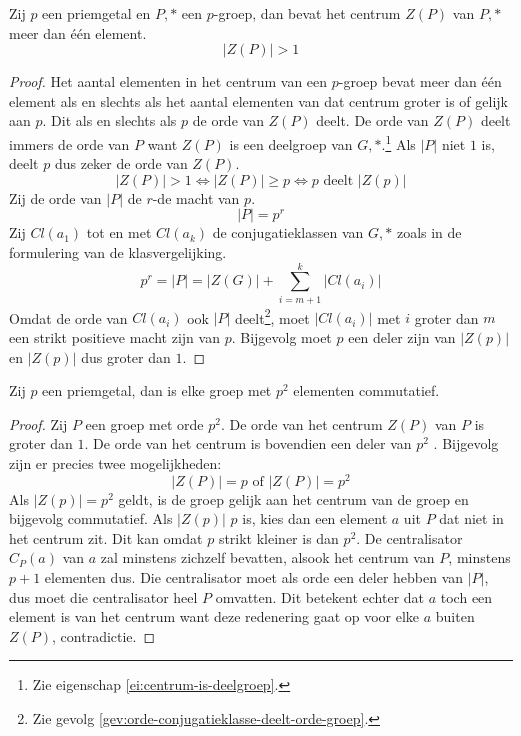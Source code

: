 \documentclass[main.tex]{subfiles}
\begin{document}
\begin{pr}
  \label{pr:orde-centrum-pgroep-groter-dan-een}
  Zij $p$ een priemgetal en $P,*$ een $p$-groep, dan bevat het centrum $Z(P)$ van $P,*$ meer dan \'e\'en element.
  \[ |Z(P)| > 1 \]
  
  \begin{proof}
    Het aantal elementen in het centrum van een $p$-groep bevat meer dan \'e\'en element als en slechts als het aantal elementen van dat centrum groter is of gelijk aan $p$.
    Dit als en slechts als $p$ de orde van $Z(P)$ deelt.
    De orde van $Z(P)$ deelt immers de orde van $P$ want $Z(P)$ is een deelgroep van $G,*$.\footnote{Zie eigenschap \ref{ei:centrum-is-deelgroep}.} 
    Als $|P|$ niet $1$ is, deelt $p$ dus zeker de orde van $Z(P)$.
    \[ |Z(P)| > 1 \Leftrightarrow |Z(P)| \ge p \Leftrightarrow p \text{ deelt } |Z(p)| \]
    Zij de orde van $|P|$ de $r$-de macht van $p$.
    \[ |P| = p^{r} \]
    Zij $Cl(a_{1})$ tot en met $Cl(a_{k})$ de conjugatieklassen van $G,*$ zoals in de formulering van de klasvergelijking.
    \[ p^{r} = |P| = |Z(G)| + \sum_{i=m+1}^{k}|Cl(a_{i})| \]
    Omdat de orde van $Cl(a_{i})$ ook $|P|$ deelt\footnote{Zie gevolg \ref{gev:orde-conjugatieklasse-deelt-orde-groep}.}, moet $|Cl(a_{i})|$ met $i$ groter dan $m$ een strikt positieve macht zijn van $p$.
    Bijgevolg moet $p$ een deler zijn van $|Z(p)|$  en $|Z(p)|$ dus groter dan $1$.
  \end{proof}
\end{pr}


\begin{st}
  Zij $p$ een priemgetal, dan is elke groep met $p^{2}$ elementen commutatief.

  \begin{proof}
    Zij $P$ een groep met orde $p^{2}$.
    De orde van het centrum $Z(P)$ van $P$ is groter dan $1$.
    De orde van het centrum is bovendien een deler van $p^{2}$ .
    Bijgevolg zijn er precies twee mogelijkheden:
    \[ |Z(P)| = p \text { of } |Z(P)| = p^{2} \]
    Als $|Z(p)| = p^{2}$ geldt, is de groep gelijk aan het centrum van de groep en bijgevolg commutatief.
    Als $|Z(p)|$ $p$ is, kies dan een element $a$ uit $P$ dat niet in het centrum zit. Dit kan omdat $p$ strikt kleiner is dan $p^{2}$.
    De centralisator $C_{P}(a)$ van $a$ zal minstens zichzelf bevatten, alsook het centrum van $P$, minstens $p+1$ elementen dus.
    Die centralisator moet als orde een deler hebben van $|P|$,  dus moet die centralisator heel $P$ omvatten.
    Dit betekent echter dat $a$ toch een element is van het centrum want deze redenering gaat op voor elke $a$ buiten $Z(P)$, contradictie. 
  \end{proof}
\end{st}
\end{document}
